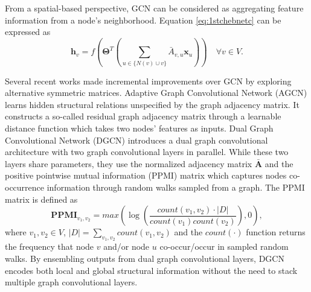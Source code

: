 	From a spatial-based perspective, GCN can be considered as aggregating feature information from a node's neighborhood. 
	Equation \ref{eq:1stchebnetc} can be expressed as
	\begin{equation}
	    \mathbf{h}_v = f(\mathbf{\Theta}^T(\sum_{u\in\{N(v)\cup v\}} \bar{A}_{v,u}\mathbf{x}_u))\quad \forall v\in V.
	    \label{eq:sgcn}
	\end{equation}

    Several recent works made incremental improvements over GCN \cite{kipf2017semi} by exploring alternative symmetric matrices.
    Adaptive Graph Convolutional Network (AGCN) \cite{li2018adaptive} learns hidden structural relations unspecified by the graph adjacency matrix. It constructs a so-called residual graph adjacency matrix through a learnable distance function which takes two nodes' features as inputs. Dual Graph Convolutional Network (DGCN) \cite{zhuang2018dual} introduces a dual graph convolutional architecture with two graph convolutional layers in parallel. While these two layers share parameters, they use the normalized adjacency matrix $\mathbf{\bar{A}}$ and the positive pointwise mutual information (PPMI) matrix which captures nodes co-occurrence information through random walks sampled from a graph. 
    The PPMI matrix is defined as 
	\begin{equation}
	\mathbf{PPMI}_{v_1,v_2} = max(\log (\frac{count(v_1,v_2)\cdot |D|}{count(v_1)count(v_2)}),0),
	\end{equation}
	where $v_1,v_2\in V$, $|D|=\sum_{v_1,v_2}count(v_1,v_2)$ and the $count(\cdot)$ function returns the frequency that node $v$ and/or node $u$ co-occur/occur in sampled random walks. By ensembling outputs from dual graph convolutional layers, DGCN encodes both local and global structural information without the need to stack multiple graph convolutional layers. 
    

